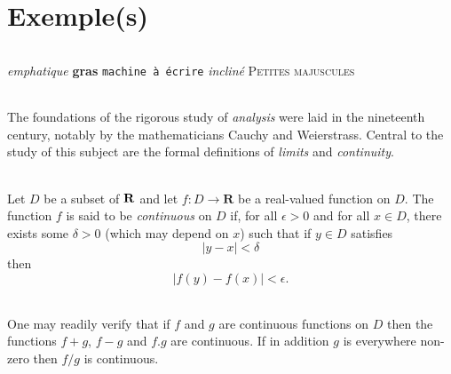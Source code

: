 
\appendix

    \part{Exemple(s)}

        \paragraph{}
            \emph{emphatique}
            \textbf{gras}
            \texttt{machine à écrire}
            \textsl{incliné}
            \textsc{Petites majuscules}

        \paragraph{}
            The foundations of the rigorous study of \emph{analysis}
            were laid in the nineteenth century, notably by the
            mathematicians Cauchy and Weierstrass. Central to the
            study of this subject are the formal definitions of
            \emph{limits} and \emph{continuity}.

        \paragraph{}
            Let $D$ be a subset of $\bf R$ and let
            $f \colon D \to \mathbf{R}$ be a real-valued function on
            $D$. The function $f$ is said to be \emph{continuous} on
            $D$ if, for all $\epsilon > 0$ and for all $x \in D$,
            there exists some $\delta > 0$ (which may depend on $x$)
            such that if $y \in D$ satisfies
            \[ |y - x| < \delta \]
            then
            \[ |f(y) - f(x)| < \epsilon. \]

        \paragraph{}
            One may readily verify that if $f$ and $g$ are continuous
            functions on $D$ then the functions $f+g$, $f-g$ and
            $f.g$ are continuous. If in addition $g$ is everywhere
            non-zero then $f/g$ is continuous.
